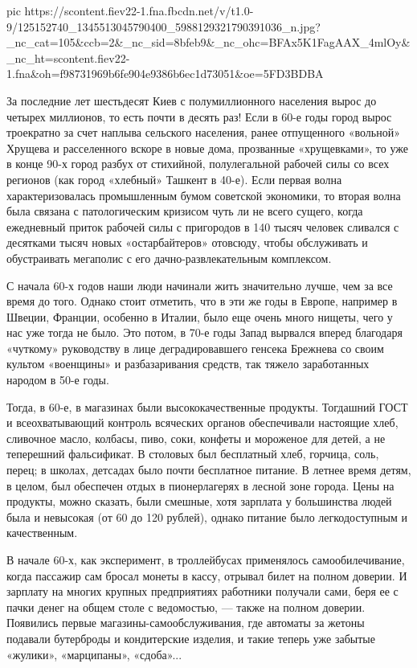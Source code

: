 pic https://scontent.fiev22-1.fna.fbcdn.net/v/t1.0-9/125152740_1345513045790400_5988129321790391036_n.jpg?_nc_cat=105&ccb=2&_nc_sid=8bfeb9&_nc_ohc=BFAx5K1FagAAX_4mlOy&_nc_ht=scontent.fiev22-1.fna&oh=f98731969b6fe904e9386b6ec1d73051&oe=5FD3BDBA
\fi

За последние лет шестьдесят Киев с полумиллионного населения вырос до четырех
миллионов, то есть почти в десять раз! Если в 60-е годы город вырос троекратно
за счет наплыва сельского населения, ранее отпущенного «вольной» Хрущева и
расселенного вскоре в новые дома, прозванные «хрущевками», то уже в конце 90-х
город разбух от стихийной, полулегальной рабочей силы со всех регионов (как
город «хлебный» Ташкент в 40-е). Если первая волна характеризовалась
промышленным бумом советской экономики, то вторая волна была связана с
патологическим кризисом чуть ли не всего сущего, когда ежедневный приток
рабочей силы с пригородов в 140 тысяч человек сливался с десятками тысяч новых
«остарбайтеров» отовсюду, чтобы обслуживать и обустраивать мегаполис с его
дачно-развлекательным комплексом.

С начала 60-х годов наши люди начинали жить значительно лучше, чем за все время до того. Однако стоит отметить, что в эти же годы в Европе, например в Швеции, Франции, особенно в Италии, было еще очень много нищеты, чего у нас уже тогда не было. Это потом, в 70-е годы Запад вырвался вперед благодаря «чуткому» руководству в лице деградировавшего генсека Брежнева со своим культом «военщины» и разбазаривания средств, так тяжело заработанных народом в 50-е годы. 

Тогда, в 60-е, в магазинах были высококачественные продукты. Тогдашний ГОСТ и
всеохватывающий контроль всяческих органов обеспечивали настоящие хлеб,
сливочное масло, колбасы, пиво, соки, конфеты и мороженое для детей, а не
теперешний фальсификат. В столовых был бесплатный хлеб, горчица, соль, перец; в
школах, детсадах было почти бесплатное питание. В летнее время детям, в целом,
был обеспечен отдых в пионерлагерях в лесной зоне города. Цены на продукты,
можно сказать, были смешные, хотя зарплата у большинства людей была и невысокая
(от 60 до 120 рублей), однако питание было легкодоступным и качественным. 

В начале 60-х, как эксперимент, в троллейбусах применялось самообилечивание,
когда пассажир сам бросал монеты в кассу, отрывал билет на полном доверии. И
зарплату на многих крупных предприятиях работники получали сами, беря ее с
пачки денег на общем столе с ведомостью, --- также на полном доверии. Появились
первые магазины-самообслуживания, где автоматы за жетоны подавали бутерброды и
кондитерские изделия, и такие теперь уже забытые «жулики», «марципаны»,
«сдоба»... 

